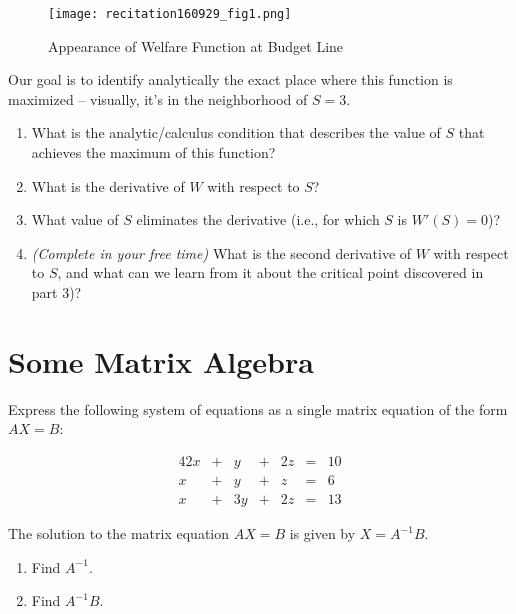 \documentclass{article}
\begin{document}
\begin{figure}[htbp]
\centering
\texttt{[image: recitation160929\_fig1.png]}
\caption{Appearance of Welfare Function at Budget Line}
\label{fig:welfare}
\end{figure}

Our goal is to identify analytically the exact place where this function is maximized -- visually, it's in the neighborhood of $S = 3$.

\begin{enumerate}
\item What is the analytic/calculus condition that describes the value of $S$ that achieves the maximum of this function?
\item What is the derivative of $W$ with respect to $S$?
\item What value of $S$ eliminates the derivative (i.e., for which $S$ is $W'(S) = 0$)?
\item \textit{(Complete in your free time)} What is the second derivative of $W$ with respect to $S$, and what can we learn from it about the critical point discovered in part 3)? 
\end{enumerate}

\section*{Some Matrix Algebra}

Express the following system of equations as a single matrix equation of the form $AX = B$:

\begin{alignat*}{4}
2x & {}+{} &  y & {}+{} & 2z & {}={} & 10 \\
 x & {}+{} &  y & {}+{} &  z & {}={} &  6 \\
 x & {}+{} & 3y & {}+{} & 2z & {}={} & 13
\end{alignat*}

The solution to the matrix equation $AX = B$ is given by $X = A^{-1}B$.

\begin{enumerate}
\item Find $A^{-1}$.
\item Find $A^{-1}B$.
\end{enumerate}
\end{document}
